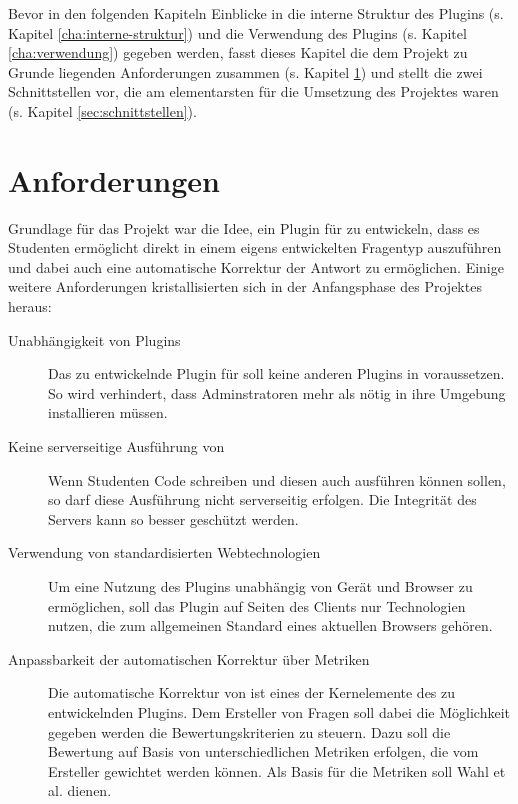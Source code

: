 Bevor in den folgenden Kapiteln Einblicke in die interne Struktur des Plugins (s. Kapitel \ref{cha:interne-struktur}) und die Verwendung des Plugins (s. Kapitel \ref{cha:verwendung}) gegeben werden, fasst dieses Kapitel die dem Projekt zu Grunde liegenden Anforderungen zusammen (s. Kapitel \ref{sec:anforderungen}) und stellt die zwei Schnittstellen vor, die am elementarsten für die Umsetzung des Projektes waren (s. Kapitel \ref{sec:schnittstellen}).

\section{Anforderungen}
\label{sec:anforderungen}

Grundlage für das  Projekt war die Idee, ein Plugin für  zu entwickeln, dass es Studenten ermöglicht  direkt in einem eigens entwickelten Fragentyp auszuführen und dabei auch eine automatische Korrektur der Antwort zu ermöglichen. Einige weitere Anforderungen kristallisierten sich in der Anfangsphase des Projektes heraus:

\begin{description}
    \item[Unabhängigkeit von Plugins] 
    Das zu entwickelnde Plugin für  soll keine anderen Plugins in  voraussetzen. So wird verhindert, dass Adminstratoren mehr als nötig in ihre  Umgebung installieren müssen.
    
    \item[Keine serverseitige Ausführung von ] 
    Wenn Studenten  Code schreiben und diesen auch ausführen können sollen, so darf diese Ausführung nicht serverseitig erfolgen. Die Integrität des Servers kann so besser geschützt werden.
    
    \item[Verwendung von standardisierten Webtechnologien] 
    Um eine Nutzung des Plugins unabhängig von Gerät und Browser zu ermöglichen, soll das Plugin auf Seiten des Clients nur Technologien nutzen, die zum allgemeinen Standard eines aktuellen Browsers gehören.
    
    \item[Anpassbarkeit der automatischen Korrektur über Metriken] 
    Die automatische Korrektur von  ist eines der Kernelemente des zu entwickelnden Plugins. Dem Ersteller von Fragen soll dabei die Möglichkeit gegeben werden die Bewertungskriterien zu steuern. Dazu soll die Bewertung auf Basis von unterschiedlichen Metriken erfolgen, die vom Ersteller gewichtet werden können. Als Basis für die Metriken soll  Wahl et al. \cite{WahlAndreas} dienen.
\end{description}


